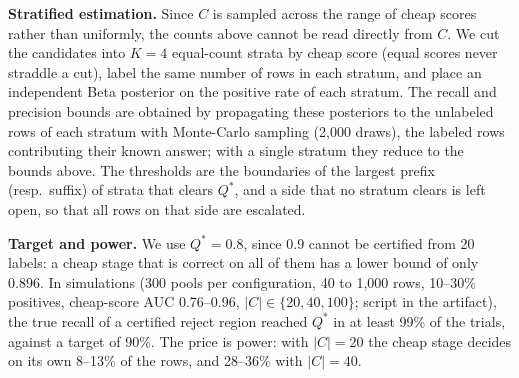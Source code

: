 \documentclass[sigconf]{acmart}
\begin{document}
\textbf{Stratified estimation.} Since $C$ is sampled across the range of cheap scores rather than uniformly, the counts above cannot be read directly from $C$. We cut the candidates into $K{=}4$ equal-count strata by cheap score (equal scores never straddle a cut), label the same number of rows in each stratum, and place an independent Beta posterior on the positive rate of each stratum. The recall and precision bounds are obtained by propagating these posteriors to the unlabeled rows of each stratum with Monte-Carlo sampling (2,000 draws), the labeled rows contributing their known answer; with a single stratum they reduce to the bounds above. The thresholds are the boundaries of the largest prefix (resp.\ suffix) of strata that clears $Q^\ast$, and a side that no stratum clears is left open, so that all rows on that side are escalated.

\textbf{Target and power.} We use $Q^\ast{=}0.8$, since $0.9$ cannot be certified from 20 labels: a cheap stage that is correct on all of them has a lower bound of only $0.896$. In simulations (300 pools per configuration, 40 to 1,000 rows, 10--30\% positives, cheap-score AUC 0.76--0.96, $|C|\in\{20,40,100\}$; script in the artifact), the true recall of a certified reject region reached $Q^\ast$ in at least 99\% of the trials, against a target of 90\%. The price is power: with $|C|{=}20$ the cheap stage decides on its own 8--13\% of the rows, and 28--36\% with $|C|{=}40$.



\end{document}
